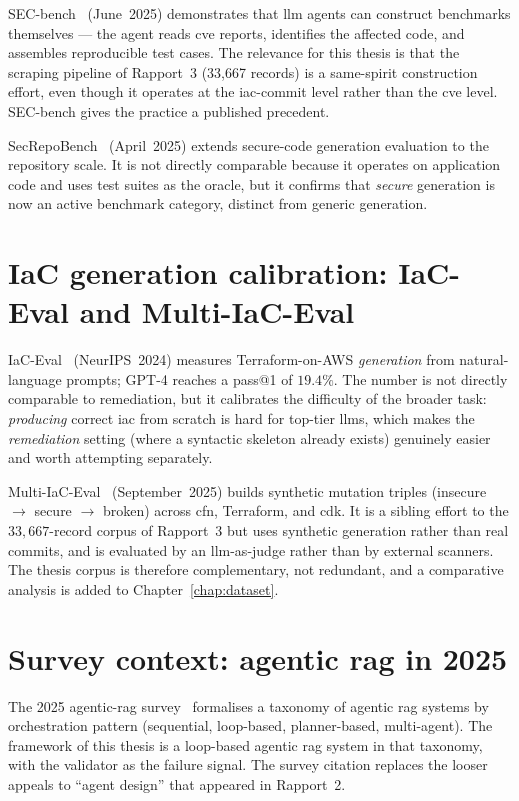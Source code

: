 \documentclass[12pt, a4paper]{report}
\begin{document}
SEC-bench~\citep{secbench2025} (June~2025) demonstrates that \gls{llm} agents
can construct benchmarks themselves --- the agent reads \gls{cve} reports,
identifies the affected code, and assembles reproducible test cases. The
relevance for this thesis is that the scraping pipeline of Rapport~3 (33,667
records) is a same-spirit construction effort, even though it operates at
the \gls{iac}-commit level rather than the \gls{cve} level. SEC-bench gives
the practice a published precedent.

SecRepoBench~\citep{secrepobench2025} (April~2025) extends secure-code
generation evaluation to the repository scale. It is not directly comparable
because it operates on application code and uses test suites as the oracle,
but it confirms that \emph{secure} generation is now an active benchmark
category, distinct from generic generation.

\section{IaC generation calibration: IaC-Eval and Multi-IaC-Eval}

IaC-Eval~\citep{kon2024iaceval} (NeurIPS~2024) measures
Terraform-on-AWS \emph{generation} from natural-language prompts;
GPT-4 reaches a pass@1 of $19.4\%$. The number is not directly comparable
to remediation, but it calibrates the difficulty of the broader task:
\emph{producing} correct \gls{iac} from scratch is hard for top-tier
\glspl{llm}, which makes the \emph{remediation} setting (where a syntactic
skeleton already exists) genuinely easier and worth attempting separately.

Multi-IaC-Eval~\citep{multi2025iaceval} (September~2025) builds synthetic
mutation triples (insecure $\to$ secure $\to$ broken) across \gls{cfn},
Terraform, and \gls{cdk}. It is a sibling effort to the
$33{,}667$-record corpus of Rapport~3 but uses synthetic generation rather
than real commits, and is evaluated by an \gls{llm}-as-judge rather than by
external scanners. The thesis corpus is therefore complementary, not
redundant, and a comparative analysis is added to
Chapter~\ref{chap:dataset}.

\section{Survey context: agentic \gls{rag} in 2025}

The 2025 agentic-\gls{rag} survey~\citep{agenticrag2025survey} formalises a
taxonomy of agentic \gls{rag} systems by orchestration pattern (sequential,
loop-based, planner-based, multi-agent). The framework of this thesis is a
loop-based agentic \gls{rag} system in that taxonomy, with the validator as
the failure signal. The survey citation replaces the looser appeals to
``agent design'' that appeared in Rapport~2.
\end{document}
